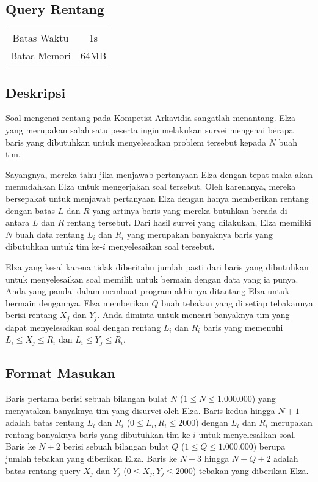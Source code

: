 \documentclass{article}
\begin{document}
\begin{center}
    \section*{Query Rentang} %

    \begin{tabular}{ | c c | }
        \hline
        Batas Waktu  & 1s \\    %
        Batas Memori & 64MB \\  %
        \hline
    \end{tabular}
\end{center}

\subsection*{Deskripsi}

Soal mengenai rentang pada Kompetisi Arkavidia sangatlah menantang.
Elza yang merupakan salah satu peserta ingin melakukan survei mengenai berapa baris yang dibutuhkan untuk menyelesaikan problem tersebut kepada $N$ buah tim.

Sayangnya, mereka tahu jika menjawab pertanyaan Elza dengan tepat maka akan memudahkan Elza untuk mengerjakan soal tersebut.
Oleh karenanya, mereka bersepakat untuk menjawab pertanyaan Elza dengan hanya memberikan rentang dengan batas $L$ dan $R$ yang artinya baris yang mereka butuhkan berada di antara $L$ dan $R$ rentang tersebut.
Dari hasil survei yang dilakukan, 
Elza memiliki $N$ buah data rentang $L_i$ dan $R_i$ yang merupakan banyaknya baris yang dibutuhkan untuk tim ke-$i$ menyelesaikan soal tersebut.

Elza yang kesal karena tidak diberitahu jumlah pasti dari baris yang dibutuhkan untuk menyelesaikan soal memilih untuk bermain dengan data yang ia punya.
Anda yang pandai dalam membuat program akhirnya ditantang Elza untuk bermain dengannya.
Elza memberikan $Q$ buah tebakan yang di setiap tebakannya berisi rentang $X_j$ dan $Y_j$.
Anda diminta untuk mencari banyaknya tim yang dapat menyelesaikan soal dengan rentang $L_i$ dan $R_i$ baris yang memenuhi $L_i \leq X_j \leq R_i$ dan $L_i \leq Y_j \leq R_i$.


\subsection*{Format Masukan}
Baris pertama berisi sebuah bilangan bulat $N$ ($1 \leq N \leq 1.000.000$) yang menyatakan banyaknya tim yang disurvei oleh Elza.
Baris kedua hingga $N + 1$ adalah batas rentang $L_i$ dan $R_i$ ($0 \leq L_i,R_i \leq 2000$) dengan $L_i$ dan $R_i$ merupakan rentang banyaknya baris yang dibutuhkan tim ke-$i$ untuk menyelesaikan soal.
Baris ke $N + 2$ berisi sebuah bilangan bulat $Q$ ($1 \leq Q \leq 1.000.000$) berupa jumlah tebakan yang diberikan Elza.
Baris ke $N + 3$ hingga $N + Q + 2$ adalah batas rentang query $X_j$ dan $Y_j$ ($0 \leq X_j,Y_j \leq 2000$) tebakan yang diberikan Elza. 
\end{document}
